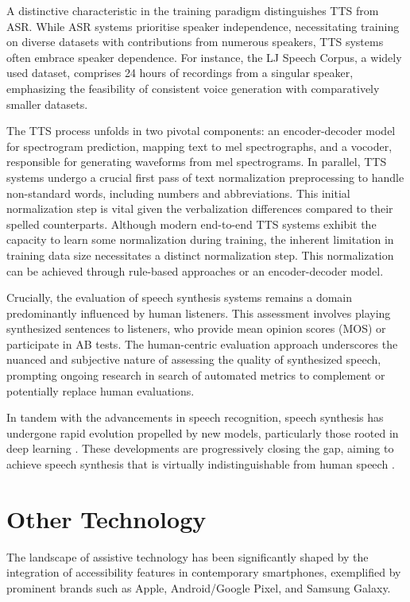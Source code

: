 \documentclass{l4proj}
\begin{document}
A distinctive characteristic in the training paradigm distinguishes TTS from ASR. While ASR systems prioritise speaker independence, necessitating training on diverse datasets with contributions from numerous speakers, TTS systems often embrace speaker dependence. For instance, the LJ Speech Corpus, a widely used dataset, comprises 24 hours of recordings from a singular speaker, emphasizing the feasibility of consistent voice generation with comparatively smaller datasets.

The TTS process unfolds in two pivotal components: an encoder-decoder model for spectrogram prediction, mapping text to mel spectrographs, and a vocoder, responsible for generating waveforms from mel spectrograms. In parallel, TTS systems undergo a crucial first pass of text normalization preprocessing to handle non-standard words, including numbers and abbreviations. This initial normalization step is vital given the verbalization differences compared to their spelled counterparts. Although modern end-to-end TTS systems exhibit the capacity to learn some normalization during training, the inherent limitation in training data size necessitates a distinct normalization step. This normalization can be achieved through rule-based approaches or an encoder-decoder model.

Crucially, the evaluation of speech synthesis systems remains a domain predominantly influenced by human listeners. This assessment involves playing synthesized sentences to listeners, who provide mean opinion scores (MOS) or participate in AB tests. The human-centric evaluation approach underscores the nuanced and subjective nature of assessing the quality of synthesized speech, prompting ongoing research in search of automated metrics to complement or potentially replace human evaluations.

In tandem with the advancements in speech recognition, speech synthesis has undergone rapid evolution propelled by new models, particularly those rooted in deep learning \citep{klatt1980software}. These developments are progressively closing the gap, aiming to achieve speech synthesis that is virtually indistinguishable from human speech \citep{tan2024naturalspeech}.

\section{Other Technology}
\label{sec:other}

The landscape of assistive technology has been significantly shaped by the integration of accessibility features in contemporary smartphones, exemplified by prominent brands such as Apple, Android/Google Pixel, and Samsung Galaxy.
\end{document}
